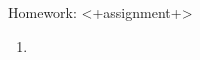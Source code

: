 \documentclass[12pt,letterpaper]{article}
\begin{document}
Homework: <+assignment+>

\begin{enumerate}
\setcounter{enumi}{<+offset+>}
\item<+woo+>
\end{enumerate}
\end{document}

